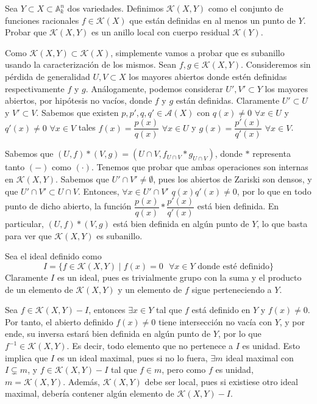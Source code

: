 \documentclass[twoside]{article}
\begin{document}
\begin{ejercicio}{6}
Sea $Y\subset X \subset \mathbb{A}_k^n$ dos variedades. Definimos $\mathcal{K}(X,Y)$ como el conjunto de funciones racionales $f \in \mathcal{K}(X)$ que están definidas en al menos un punto de $Y$. Probar que $\mathcal{K}(X,Y)$ es un anillo local con cuerpo residual $\mathcal{K}(Y)$.
\begin{solucion}
Como $\mathcal{K}(X,Y)\subset \mathcal{K}(X)$, simplemente vamos a probar que es subanillo usando la caracterización de los mismos. Sean $f,g\in \mathcal{K}(X,Y)$. Consideremos sin pérdida de generalidad $U,V\subset X$ los mayores abiertos donde estén definidas respectivamente $f$ y $g$. Análogamente, podemos considerar $U',V'\subset Y$ los mayores abiertos, por hipótesis no vacíos, donde $f$ y $g$ están definidas. Claramente $U'\subset U$ y $V' \subset V$. Sabemos que existen $p,p',q,q'\in\mathcal{A}(X)$ con $q(x)\neq 0$ $\forall x \in U$ y $q'(x)\neq 0$ $\forall x \in V$ tales $f(x)=\dfrac{p(x)}{q(x)}$ $\forall x\in U$ y $g(x)=\dfrac{p'(x)}{q'(x)}$ $\forall x\in V$. 

Sabemos que $(U,f)\ast (V,g) = (U\cap V, f_{U\cap V}\ast g_{U\cap V})$, donde $\ast$ representa tanto $(-)$ como $(\cdot)$. Tenemos que probar que ambas operaciones son internas en $\mathcal{K}(X,Y)$. Sabemos que $U'\cap V' \neq \emptyset$, pues los abiertos de Zariski son densos, y que $U'\cap V' \subset U\cap V$. Entonces, $\forall x \in U'\cap V'$ $q(x)q'(x)\neq 0$, por lo que en todo punto de dicho abierto, la función $\dfrac{p(x)}{q(x)}\ast\dfrac{p'(x)}{q'(x)}$ está bien definida. En particular, $(U,f)\ast (V,g)$ está bien definida en algún punto de $Y$, lo que basta para ver que $\mathcal{K}(X,Y)$ es subanillo.

Sea el ideal definido como
$$
I = \{f \in \mathcal{K}(X,Y) \mid \text{$f(x)=0$ $\forall x \in Y$ donde esté definido}\}
$$
Claramente $I$ es un ideal, pues es trivialmente grupo con la suma y el producto de un elemento de $\mathcal{K}(X,Y)$ y un elemento de $f$ sigue perteneciendo a $Y$. 

Sea $f\in \mathcal{K}(X,Y)-I$, entonces $\exists x \in Y$ tal que $f$ está definido en $Y$ y $f(x)\neq 0$. Por tanto, el abierto definido $f(x)\neq 0$ tiene intersección no vacía con $Y$, y por ende, su inversa estará bien definida en algún punto de $Y$, por lo que $f^{-1}\in \mathcal{K}(X,Y)$. Es decir, todo elemento que no pertenece a $I$ es unidad. Esto implica que $I$ es un ideal maximal, pues si no lo fuera, $\exists m$ ideal maximal con $I \subsetneq m$, y  $f\in \mathcal{K}(X,Y)-I$ tal que $f\in m$, pero como $f$ es unidad, $m = \mathcal{K}(X,Y)$. Además, $\mathcal{K}(X,Y)$ debe ser local, pues si existiese otro ideal maximal, debería contener algún elemento de $\mathcal{K}(X,Y)-I$.


\end{solucion}
\end{ejercicio}
\end{document}

